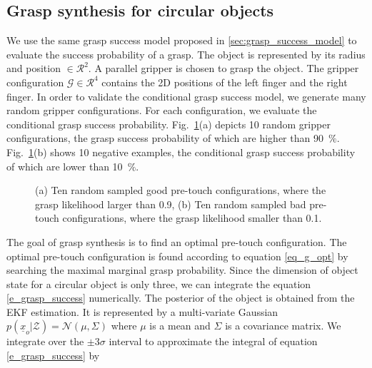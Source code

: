 \subsection{Grasp synthesis for circular objects}
We use the same grasp success model proposed in \ref{sec:grasp_success_model} to evaluate the success probability of a grasp. The object is represented by its radius and position $\in \mathcal{R}^2$. A parallel gripper is chosen to grasp the object. The gripper configuration $\mathcal{G} \in \mathcal{R}^4$ contains the 2D positions of the left finger and the right finger. In order to validate the conditional grasp success model, we generate many random gripper configurations. For each configuration, we evaluate the conditional grasp success probability. Fig.~\ref{fig:circular_grasp_success}(a) depicts 10 random gripper configurations, the grasp success probability of which are higher than 90~$\%$. Fig.~\ref{fig:circular_grasp_success}(b) shows 10 negative examples, the conditional grasp success probability of which are lower than 10~$\%$. 

\begin{figure}[!htbp]
\centering
\def\svgwidth{1\linewidth}

\caption{(a) Ten random sampled good pre-touch configurations, where the grasp likelihood larger than 0.9, (b) Ten random sampled bad pre-touch configurations, where the grasp likelihood smaller than 0.1.}
\label{fig:circular_grasp_success}
\end{figure}	 

The goal of grasp synthesis is to find an optimal pre-touch configuration.  The optimal pre-touch configuration is found according to equation \ref{eq_g_opt} by searching the maximal marginal grasp probability. Since the dimension of object state for a circular object is only three, we can integrate the equation \ref{e_grasp_success} numerically. The posterior of the object is obtained from the EKF estimation. It is represented by a multi-variate Gaussian $p(\underline{x}_o|\mathcal{Z}) = \mathcal{N}(\mu, \Sigma)$  where $\mu$ is a mean and $\Sigma$ is a covariance matrix. We integrate over the $\pm3\sigma$ interval to approximate the integral of equation \ref{e_grasp_success} by 

